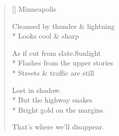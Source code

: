 \label{ch:driving_cross_country}
\settowidth{\versewidth}{As if cut from slate.\quad Sunlight}
\begin{verse}[\versewidth]
Minneapolis

Cleansed by thunder \& lightning\\*
Looks cool \& sharp

As if cut from slate.\quad Sunlight\\*
Flashes from the upper stories\\*
Streets \& traffic are still

Lost in shadow.\\*
But the highway snakes\\*
Bright gold on the margins.

That's where we'll disappear.
\end{verse}
